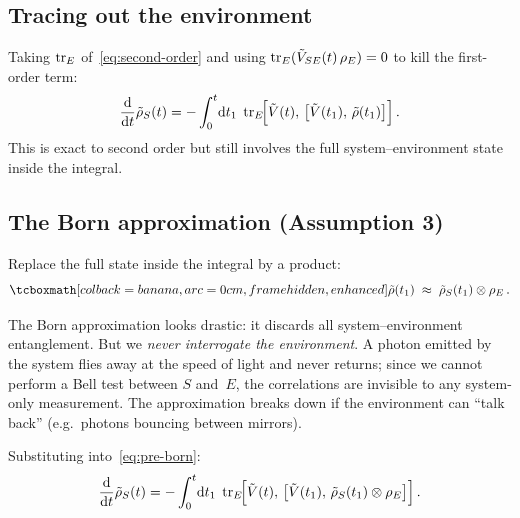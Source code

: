 \subsection{Tracing out the environment}%
\label{sec:trace-out-env}

Taking $\operatorname{tr}_E$ of~\eqref{eq:second-order} and using
$\operatorname{tr}_E(\tilde{V}_{SE}(t)\,\rho_E)=0$ to kill the first-order term:
\begin{equation}\label{eq:pre-born}
  \frac{\mathrm{d}}{\mathrm{d} t}\tilde{\rho}_S(t)
  = -\int_0^{t}\!\mathrm{d} t_1\;
    \operatorname{tr}_E\!\Bigl[\tilde{V}(t),\,
      \bigl[\tilde{V}(t_1),\,\tilde{\rho}(t_1)\bigr]\Bigr]\,.
\end{equation}
This is exact to second order but still involves the full
system--environment state inside the integral.

\subsection{The Born approximation (Assumption 3)}%
\label{sec:born-approx}

Replace the full state inside the integral by a product:
\begin{equation}\label{eq:born}
  \eqbox{\tilde{\rho}(t_1)
  \;\approx\;
  \tilde{\rho}_S(t_1) \tp \rho_E}\,.
\end{equation}

\begin{intuition}
  The Born approximation looks drastic: it discards all
  system--environment entanglement.  But we \emph{never interrogate
  the environment}.  A photon emitted by the system flies away at the
  speed of light and never returns; since we cannot perform a Bell
  test between $S$ and~$E$, the correlations are invisible to any
  system-only measurement.  The approximation breaks down if the
  environment can ``talk back'' (e.g.\ photons bouncing between
  mirrors).
\end{intuition}

Substituting into~\eqref{eq:pre-born}:
\begin{equation}\label{eq:born-eq}
  \frac{\mathrm{d}}{\mathrm{d} t}\tilde{\rho}_S(t)
  = -\int_0^{t}\!\mathrm{d} t_1\;
    \operatorname{tr}_E\!\Bigl[\tilde{V}(t),\,
      \bigl[\tilde{V}(t_1),\,
            \tilde{\rho}_S(t_1)\otimes\rho_E\bigr]\Bigr]\,.
\end{equation}

